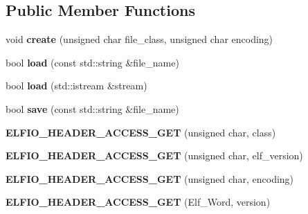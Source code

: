 \subsection*{Public Member Functions}
\begin{DoxyCompactItemize}
\item 
void {\bfseries create} (unsigned char file\+\_\+class, unsigned char encoding)\hypertarget{class_e_l_f_i_o_1_1elfio_a505f88e23277cb7945d4f411fe2b4d85}{}\label{class_e_l_f_i_o_1_1elfio_a505f88e23277cb7945d4f411fe2b4d85}

\item 
bool {\bfseries load} (const std\+::string \&file\+\_\+name)\hypertarget{class_e_l_f_i_o_1_1elfio_af313dfceaf57ca8342e1cebba19a986e}{}\label{class_e_l_f_i_o_1_1elfio_af313dfceaf57ca8342e1cebba19a986e}

\item 
bool {\bfseries load} (std\+::istream \&stream)\hypertarget{class_e_l_f_i_o_1_1elfio_a1eb421b95b3deb91f7e4c28cbf094614}{}\label{class_e_l_f_i_o_1_1elfio_a1eb421b95b3deb91f7e4c28cbf094614}

\item 
bool {\bfseries save} (const std\+::string \&file\+\_\+name)\hypertarget{class_e_l_f_i_o_1_1elfio_a4dfd167b10c72779390871865d16db61}{}\label{class_e_l_f_i_o_1_1elfio_a4dfd167b10c72779390871865d16db61}

\item 
{\bfseries E\+L\+F\+I\+O\+\_\+\+H\+E\+A\+D\+E\+R\+\_\+\+A\+C\+C\+E\+S\+S\+\_\+\+G\+ET} (unsigned char, class)\hypertarget{class_e_l_f_i_o_1_1elfio_a45ae995bbe7d5e483aeac5ff87919fe5}{}\label{class_e_l_f_i_o_1_1elfio_a45ae995bbe7d5e483aeac5ff87919fe5}

\item 
{\bfseries E\+L\+F\+I\+O\+\_\+\+H\+E\+A\+D\+E\+R\+\_\+\+A\+C\+C\+E\+S\+S\+\_\+\+G\+ET} (unsigned char, elf\+\_\+version)\hypertarget{class_e_l_f_i_o_1_1elfio_a20456cc1e0bf4600acc7d17ee7cdf5d3}{}\label{class_e_l_f_i_o_1_1elfio_a20456cc1e0bf4600acc7d17ee7cdf5d3}

\item 
{\bfseries E\+L\+F\+I\+O\+\_\+\+H\+E\+A\+D\+E\+R\+\_\+\+A\+C\+C\+E\+S\+S\+\_\+\+G\+ET} (unsigned char, encoding)\hypertarget{class_e_l_f_i_o_1_1elfio_a327474e3c1233af704e0bfd8b03c4380}{}\label{class_e_l_f_i_o_1_1elfio_a327474e3c1233af704e0bfd8b03c4380}

\item 
{\bfseries E\+L\+F\+I\+O\+\_\+\+H\+E\+A\+D\+E\+R\+\_\+\+A\+C\+C\+E\+S\+S\+\_\+\+G\+ET} (Elf\+\_\+\+Word, version)\hypertarget{class_e_l_f_i_o_1_1elfio_a41de7411abbe40fd2c4d9758f71794d6}{}\label{class_e_l_f_i_o_1_1elfio_a41de7411abbe40fd2c4d9758f71794d6}


\end{DoxyCompactItemize}
